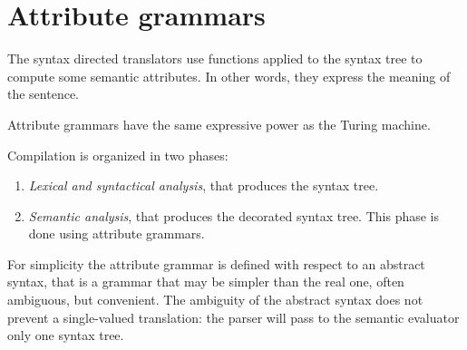 \section{Attribute grammars}

The syntax directed translators use functions applied to the syntax tree to compute some semantic attributes.
In other words, they express the meaning of the sentence. 

Attribute grammars have the same expressive power as the Turing machine. 

Compilation is organized in two phases: 
\begin{enumerate}
    \item \textit{Lexical and syntactical analysis}, that produces the syntax tree. 
    \item \textit{Semantic analysis}, that produces the decorated syntax tree. 
        This phase is done using attribute grammars. 
\end{enumerate}

For simplicity the attribute grammar is defined with respect to an abstract syntax, that is a grammar that may be simpler than the real one, often ambiguous, but convenient. 
The ambiguity of the abstract syntax does not prevent a single-valued translation: the parser will pass to the semantic evaluator only one syntax tree. 


